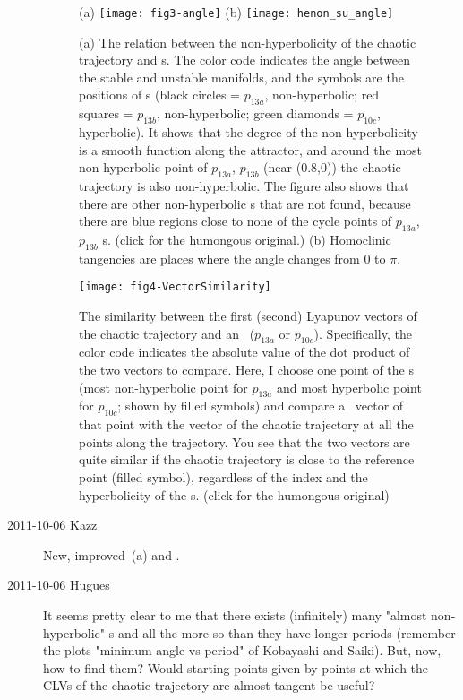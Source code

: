 \begin{description}
\begin{figure}
(a)
\texttt{[image: fig3-angle]}{}
(b)
\texttt{[image: henon\_su\_angle]}{}
\caption{
(a)
The relation between the non-hyperbolicity of the chaotic trajectory and
\po s. The color code indicates the angle between the stable and unstable
manifolds, and the symbols are the positions of \po s (black circles =
$p_{13a}$, non-hyperbolic; red squares = $p_{13b}$, non-hyperbolic; green
diamonds = $p_{10c}$, hyperbolic). It shows that the degree of the
non-hyperbolicity is a smooth function along the attractor, and around
the most non-hyperbolic point of  $p_{13a}$, $p_{13b}$ (near (0.8,0)) the
chaotic trajectory is also non-hyperbolic. The figure also shows that
there are other non-hyperbolic \po s that are not found, because there
are blue regions close to none of the cycle points of $p_{13a}$,
$p_{13b}$ \po s. (click
 for the
humongous original.)
(b)
Homoclinic tangencies are places where the angle changes from $0$ to
$\pi$.
    }
\label{fig3-angle}
\end{figure}


\begin{figure}
\texttt{[image: fig4-VectorSimilarity]}
\caption{
The similarity between the first (second) Lyapunov vectors of the
chaotic trajectory and an \po\ ($p_{13a}$ or $p_{10c}$). Specifically, the color
code indicates the absolute value of the dot product of the two vectors
to compare. Here, I choose one point of the \po s (most non-hyperbolic
point for $p_{13a}$ and most hyperbolic point for $p_{10c}$; shown by filled
symbols) and compare a \po\ vector of that point with the vector of the
chaotic trajectory at all the points along the trajectory. You see that
the two vectors are quite similar if the chaotic trajectory is close to
the reference point (filled symbol), regardless of the index and the
hyperbolicity of the \po s.
(click  for
the humongous original)
}
\label{fig4-VectorSimilarity}
\end{figure}


\item[2011-10-06 Kazz]
New, improved \,(a) and .

\item[2011-10-06 Hugues]
It seems pretty clear to me that there exists (infinitely) many "almost
non-hyperbolic" \po s and all the more so than they have longer periods
(remember the plots "minimum angle vs period" of Kobayashi and Saiki).
But, now, how to find them? Would starting points given by points at
which the CLVs of the chaotic trajectory are almost tangent be useful?


\end{description}
